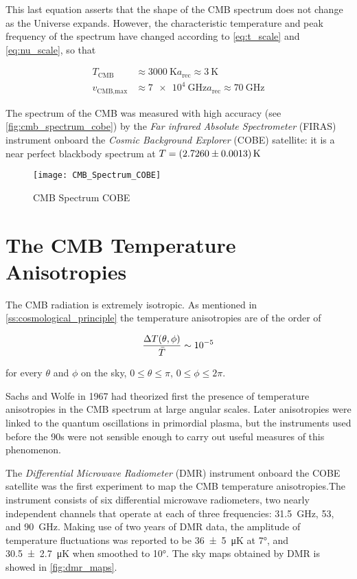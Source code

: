 This last equation asserts that the shape of the CMB spectrum does not
change as the Universe expands. However, the characteristic temperature and
peak frequency of the spectrum have changed according to
\autoref{eq:t_scale} and \autoref{eq:nu_scale}, so that

\begin{align}
        T_{\text{CMB}} & \approx \SI{3000}{\kelvin} a_{\text{rec}} \approx
        \SI{3}{\kelvin} \\
        v_{\text{CMB,max}} & \approx \SI{7e4}{\giga\hertz} a_{\text{rec}}
        \approx \SI{70}{\giga\hertz}
\end{align}

The spectrum of the CMB was measured with high accuracy
(see \autoref{fig:cmb_spectrum_cobe})
by the \emph{Far infrared Absolute Spectrometer} (FIRAS) instrument onboard
the \emph{Cosmic Background Explorer} (COBE) satellite: it is a near
perfect blackbody spectrum at $T = \SI{2.7260 \pm 0.0013}{\kelvin}$

\begin{figure}
        \centering
        \texttt{[image: CMB\_Spectrum\_COBE]}
        \caption{CMB Spectrum COBE}
        \label{fig:cmb_spectrum_cobe}
\end{figure}

\section{The CMB Temperature Anisotropies}

The CMB radiation is extremely isotropic. As mentioned in
\autoref{ss:cosmological_principle} the temperature anisotropies are of the
order of

\begin{equation}
\frac{\Delta T\qty(\theta,\phi)}{\bar T} \sim \num{e-5}
\end{equation}

for every $\theta$ and $\phi$ on the sky, $0 \leq \theta \leq \pi$,
$0 \leq \phi \leq 2\pi$.

Sachs and Wolfe in 1967 had theorized first the presence of temperature
anisotropies in the CMB spectrum at large angular scales. Later 
anisotropies were linked to the quantum oscillations in primordial plasma,
but the instruments used before the 90s were not sensible enough to carry
out useful measures of this phenomenon.

The \emph{Differential Microwave Radiometer} (DMR) instrument onboard the
COBE satellite was the first experiment to map the CMB temperature
anisotropies.The instrument consists of six differential microwave
radiometers, two nearly independent channels that operate at each of three
frequencies: \SI{ 31.5}{\giga\hertz}, \num{53}, and \SI{90}{\giga\hertz}.  
Making use of two years of DMR data, the amplitude of temperature fluctuations
was reported to be
\SI{36 \pm 5}{\micro\kelvin} at \ang{7}, and
\SI{30.5 \pm 2.7}{\micro\kelvin} when smoothed to \ang{10}.
The sky maps obtained by DMR is showed in \autoref{fig:dmr_maps}.

